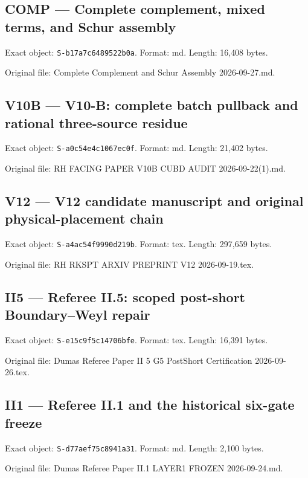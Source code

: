 \documentclass[
  10pt,
  a4paper,
  10pt,
  oneside,
  openany]{book}
\begin{document}
\subsection{COMP --- Complete complement, mixed terms, and Schur
assembly}\label{source-comp}

Exact object: \texttt{S-b17a7c6489522b0a}. Format: md. Length: 16,408
bytes.

Original file: Complete Complement and Schur Assembly 2026-09-27.md.

\subsection{V10B --- V10-B: complete batch pullback and rational
three-source residue}\label{source-v10b}

Exact object: \texttt{S-a0c54e4c1067ec0f}. Format: md. Length: 21,402
bytes.

Original file: RH FACING PAPER V10B CUBD AUDIT 2026-09-22(1).md.

\subsection{V12 --- V12 candidate manuscript and original
physical-placement chain}\label{source-v12}

Exact object: \texttt{S-a4ac54f9990d219b}. Format: tex. Length: 297,659
bytes.

Original file: RH RKSPT ARXIV PREPRINT V12 2026-09-19.tex.

\subsection{II5 --- Referee II.5: scoped post-short Boundary--Weyl
repair}\label{source-ii5}

Exact object: \texttt{S-e15c9f5c14706bfe}. Format: tex. Length: 16,391
bytes.

Original file: Dumas Referee Paper II 5 G5 PostShort Certification
2026-09-26.tex.

\subsection{II1 --- Referee II.1 and the historical six-gate
freeze}\label{source-ii1}

Exact object: \texttt{S-d77aef75c8941a31}. Format: md. Length: 2,100
bytes.

Original file: Dumas Referee Paper II.1 LAYER1 FROZEN 2026-09-24.md.
\end{document}
